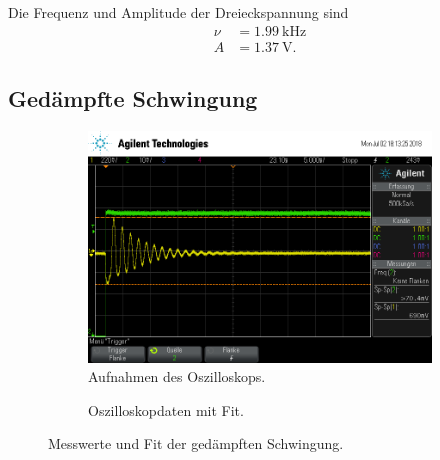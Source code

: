 Die Frequenz und Amplitude der Dreieckspannung sind
\begin{align*}
  \nu &= \SI{1.99}{\kilo\hertz} \\
  A &= \SI{1.37}{\volt}.
\end{align*}

\subsection{Ged\"ampfte Schwingung}

\begin{figure}[ht]
  \centering
  \begin{subfigure}{\textwidth}
    \centering
    \includegraphics[height=0.3\textheight]{data/scope_275.png}
    \caption{Aufnahmen des Oszilloskops.}%
    \label{fig:gedaempft_oszilloskop}
  \end{subfigure}
  \begin{subfigure}{\textwidth}
    \centering
    
    \caption{Oszilloskopdaten mit Fit.}%
    \label{fig:gedaempft_fit}
  \end{subfigure}
  \caption{Messwerte und Fit der gedämpften Schwingung.}%
  \label{fig:gedaempft}
\end{figure}

